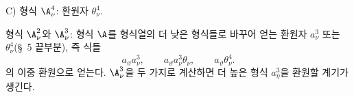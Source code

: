 
\noindent C) 형식 $\A_\nu^4$: 환원자 $\theta_\nu^4$.

형식 $\A_\nu^2$와 $\A_\nu^3$: 형식 $\A$를 형식열의 더 낮은 형식들로 바꾸어 얻는 환원자 $a_\nu^3$ 또는 $\theta_\nu^4$(\S\ 5 끝부분), 즉 식들
\[
a_\vartheta a_\nu^3,\qquad
a_\vartheta a_\nu^3\theta_\nu,\qquad
a_\vartheta\theta_\nu^4.
\]
의 이중 환원으로 얻는다. $\A_\nu^3$을 두 가지로 계산하면 더 높은 형식 $a_\eta^3$을 환원할 계기가 생긴다.
